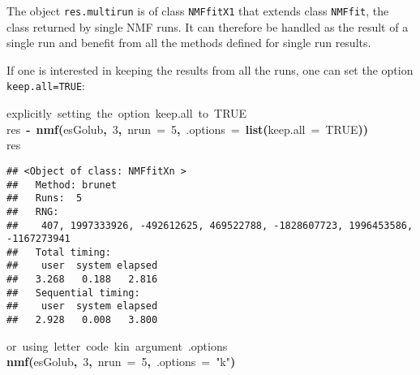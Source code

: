 \documentclass[a4paper]{article}\usepackage{graphicx, color}
\makeatletter
\newcommand{\hlnumber}[1]{\textcolor[rgb]{0,0,0}{#1}}%
\newcommand{\hlfunctioncall}[1]{\textcolor[rgb]{0.501960784313725,0,0.329411764705882}{\textbf{#1}}}%
\newcommand{\hlstring}[1]{\textcolor[rgb]{0.6,0.6,1}{#1}}%
\newcommand{\hlkeyword}[1]{\textcolor[rgb]{0,0,0}{\textbf{#1}}}%
\newcommand{\hlargument}[1]{\textcolor[rgb]{0.690196078431373,0.250980392156863,0.0196078431372549}{#1}}%
\newcommand{\hlcomment}[1]{\textcolor[rgb]{0.180392156862745,0.6,0.341176470588235}{#1}}%
\newcommand{\hlassignement}[1]{\textcolor[rgb]{0,0,0}{\textbf{#1}}}%
\newcommand{\hlsymbol}[1]{\textcolor[rgb]{0,0,0}{#1}}%
\newcommand{\hlstd}[1]{\textcolor[rgb]{0,0,0}{#1}}%
\newenvironment{kframe}{%
 \def\FrameCommand##1{\hskip\@totalleftmargin \hskip-\fboxsep
 \colorbox{shadecolor}{##1}\hskip-\fboxsep
     \hskip-\linewidth \hskip-\@totalleftmargin \hskip\columnwidth}%
 \MakeFramed {\advance\hsize-\width
   \@totalleftmargin\z@ \linewidth\hsize
   \@setminipage}}%
 {\par\unskip\endMakeFramed}
\newenvironment{knitrout}{}{} %
\let\code=\texttt
\makeatother
\begin{document}
The object \code{res.multirun} is of class \code{NMFfitX1} that extends class \code{NMFfit}, the class returned by single NMF runs. 
It can therefore be handled as the result of a single run and benefit from all the methods defined for single run results.

\medskip
If one is interested in keeping the results from all the runs, one can set the option \code{keep.all=TRUE}:

\begin{knitrout}
\color{fgcolor}\begin{kframe}
\begin{flushleft}
\ttfamily\noindent
\hlcomment{\usebox{\hlnormalsizeboxhash}{\ }explicitly{\ }setting{\ }the{\ }option{\ }keep.all{\ }to{\ }TRUE}\hspace*{\fill}\\
\hlstd{}\hlsymbol{res}{\ }\hlassignement{\usebox{\hlnormalsizeboxlessthan}-}{\ }\hlfunctioncall{nmf}\hlkeyword{(}\hlsymbol{esGolub}\hlkeyword{,}{\ }\hlnumber{3}\hlkeyword{,}{\ }\hlargument{nrun}{\ }\hlargument{=}{\ }\hlnumber{5}\hlkeyword{,}{\ }\hlargument{.options}{\ }\hlargument{=}{\ }\hlfunctioncall{list}\hlkeyword{(}\hlargument{keep.all}{\ }\hlargument{=}{\ }\hlnumber{TRUE}\hlkeyword{)}\hlkeyword{)}\hspace*{\fill}\\
\hlstd{}\hlsymbol{res}\mbox{}
\normalfont
\end{flushleft}
\begin{verbatim}
## <Object of class: NMFfitXn >
##   Method: brunet 
##   Runs:  5 
##   RNG:
##    407, 1997333926, -492612625, 469522788, -1828607723, 1996453586, -1167273941 
##   Total timing:
##    user  system elapsed 
##   3.268   0.188   2.816 
##   Sequential timing:
##    user  system elapsed 
##   2.928   0.008   3.800 
\end{verbatim}
\end{kframe}
\end{knitrout}


\begin{knitrout}
\color{fgcolor}\begin{kframe}
\begin{flushleft}
\ttfamily\noindent
\hlcomment{\usebox{\hlnormalsizeboxhash}{\ }or{\ }using{\ }letter{\ }code{\ }\usebox{\hlnormalsizeboxsinglequote}k\usebox{\hlnormalsizeboxsinglequote}{\ }in{\ }argument{\ }.options}\hspace*{\fill}\\
\hlstd{}\hlfunctioncall{nmf}\hlkeyword{(}\hlsymbol{esGolub}\hlkeyword{,}{\ }\hlnumber{3}\hlkeyword{,}{\ }\hlargument{nrun}{\ }\hlargument{=}{\ }\hlnumber{5}\hlkeyword{,}{\ }\hlargument{.options}{\ }\hlargument{=}{\ }\hlstring{"{}k"{}}\hlkeyword{)}\mbox{}
\normalfont
\end{flushleft}
\end{kframe}
\end{knitrout}
\end{document}
